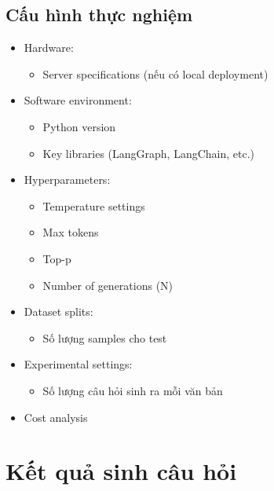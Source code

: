 \subsection{Cấu hình thực nghiệm}
\begin{itemize}
    \item Hardware:
    \begin{itemize}
        \item Server specifications (nếu có local deployment)
    \end{itemize}
    \item Software environment:
    \begin{itemize}
        \item Python version
        \item Key libraries (LangGraph, LangChain, etc.)
    \end{itemize}
    \item Hyperparameters:
    \begin{itemize}
        \item Temperature settings
        \item Max tokens
        \item Top-p
        \item Number of generations (N)
    \end{itemize}
    \item Dataset splits:
    \begin{itemize}
        \item Số lượng samples cho test
    \end{itemize}
    \item Experimental settings:
    \begin{itemize}
        \item Số lượng câu hỏi sinh ra mỗi văn bản
    \end{itemize}
    \item Cost analysis
\end{itemize}

\section{Kết quả sinh câu hỏi}

